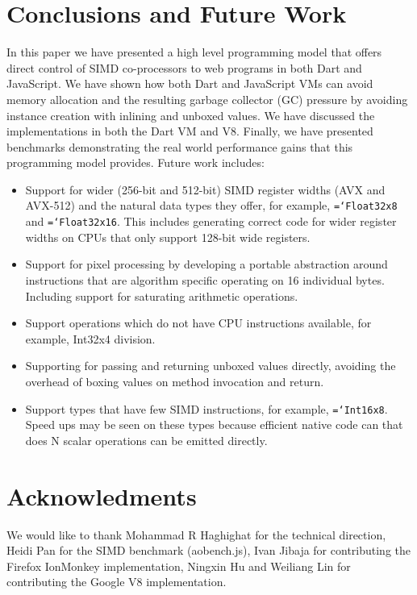 \documentclass{sigplanconf}
\newcommand{\ttt}[1]{{\texttt{\hyphenchar\font=`\-\relax #1}}}%
\begin{document}
\section{Conclusions and Future Work}

In this paper we have presented a high level programming model that offers
direct control of SIMD co-processors to web programs in both Dart and
JavaScript. We have shown how both Dart and JavaScript VMs can avoid memory
allocation and the resulting garbage collector (GC) pressure by avoiding
instance creation with inlining and unboxed values. We have discussed the
implementations in both the Dart VM and V8. Finally, we have presented
benchmarks demonstrating the real world performance gains that this programming
model provides. Future work includes:

\begin{itemize}
\item
Support for wider (256-bit and 512-bit) SIMD register widths (AVX and AVX-512)
and the natural data types they offer, for example, \ttt{Float32x8} and
\ttt{Float32x16}. This includes generating correct code for wider register
widths on CPUs that only support 128-bit wide registers.

\item
Support for pixel processing by developing a portable abstraction around
instructions that are algorithm specific operating on 16 individual bytes.
Including support for saturating arithmetic operations.

\item
Support operations which do not have CPU instructions available, for example,
Int32x4 division.

\item
Supporting for passing and returning unboxed values directly, avoiding the
overhead of boxing values on method invocation and return.

\item
Support types that have few SIMD instructions, for example, \ttt{Int16x8}. Speed
ups may be seen on these types because efficient native code can that does N
scalar operations can be emitted directly.

\end{itemize}

\section{Acknowledments}
We would like to thank Mohammad R Haghighat
for the technical direction, Heidi Pan for the SIMD benchmark
(aobench.js), Ivan Jibaja for contributing the Firefox IonMonkey
implementation, Ningxin Hu and Weiliang Lin for contributing the
Google V8 implementation.



\end{document}
